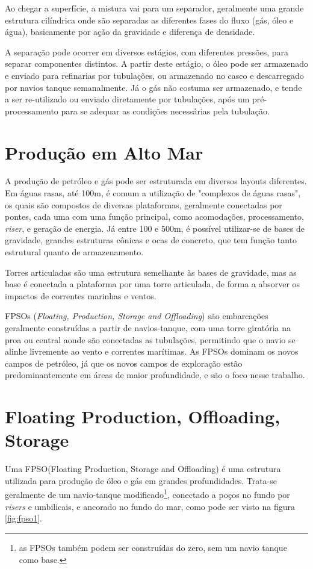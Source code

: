 Ao chegar a superfície, a mistura vai para um separador, geralmente uma grande estrutura cilíndrica onde são separadas as diferentes fases do fluxo (gás, óleo e água), basicamente por ação da gravidade e diferença de densidade.
%


A separação pode ocorrer em diversos estágios, com diferentes pressões, para separar componentes distintos.
%
A partir deste estágio, o óleo pode ser armazenado e enviado para refinarias por tubulações, ou armazenado no casco e descarregado por navios tanque semanalmente.
%
Já o gás não costuma ser armazenado, e tende a ser re-utilizado ou enviado diretamente por tubulações, após um pré-processamento para se adequar as condições necessárias pela tubulação.
%

\section{Produção em Alto Mar}

A produção de petróleo e gás pode ser estruturada em diversos layouts diferentes.
% 
Em águas rasas, até 100m, é comum a utilização de "complexos de águas rasas", os quais são compostos de diversas plataformas, geralmente conectadas por pontes, cada uma com uma função principal, como acomodações, processamento, \textit{riser}, e geração de energia.
%
Já entre 100 e 500m, é possível utilizar-se de bases de gravidade, grandes estruturas cônicas e ocas de concreto, que tem função tanto estrutural quanto de armazenamento. 
%

Torres articuladas são uma estrutura semelhante às bases de gravidade, mas as base é conectada a plataforma por uma torre articulada, de forma a absorver os impactos de correntes marinhas e ventos.
%

FPSOs (\textit{Floating, Production, Storage and Offloading}) são embarcações geralmente construídas a partir de navios-tanque, com uma torre giratória na proa ou central aonde são conectadas as tubulações, permitindo que o navio se alinhe livremente ao vento e correntes marítimas. 
%
As FPSOs dominam os novos campos de petróleo, já que os novos campos de exploração estão predominantemente em áreas de maior profundidade, e são o foco nesse trabalho.

\section{Floating Production, Offloading, Storage}
Uma FPSO(Floating Production, Storage and Offloading) é uma estrutura utilizada para produção de óleo e gás em grandes profundidades. Trata-se geralmente de um navio-tanque modificado\footnote{as FPSOs também podem ser construídas do zero, sem um navio tanque como base.}, conectado a poços no fundo por \textit{risers} e umbilicais, e ancorado no fundo do mar, como pode ser visto na figura \ref{fig:fpso1}.



